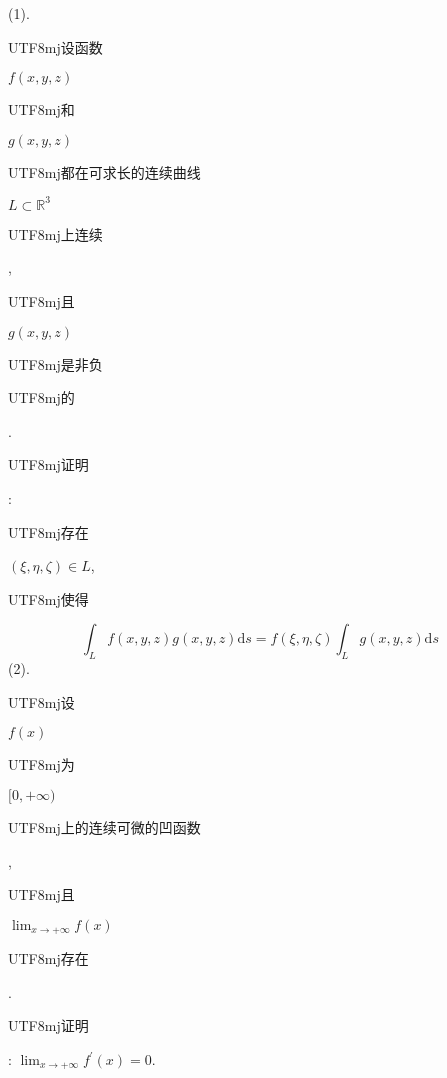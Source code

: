 \documentclass[10pt]{article}
\begin{document}
(1). \begin{CJK}{UTF8}{mj}设函数\end{CJK} $f(x, y, z)$ \begin{CJK}{UTF8}{mj}和\end{CJK} $g(x, y, z)$ \begin{CJK}{UTF8}{mj}都在可求长的连续曲线\end{CJK} $L \subset \mathbb{R}^{3}$ \begin{CJK}{UTF8}{mj}上连续\end{CJK}, \begin{CJK}{UTF8}{mj}且\end{CJK} $g(x, y, z)$ \begin{CJK}{UTF8}{mj}是非负\end{CJK} \begin{CJK}{UTF8}{mj}的\end{CJK}. \begin{CJK}{UTF8}{mj}证明\end{CJK}: \begin{CJK}{UTF8}{mj}存在\end{CJK} $(\xi, \eta, \zeta) \in L$, \begin{CJK}{UTF8}{mj}使得\end{CJK}
$$
\int_{L} f(x, y, z) g(x, y, z) \mathrm{d} s=f(\xi, \eta, \zeta) \int_{L} g(x, y, z) \mathrm{d} s
$$
(2). \begin{CJK}{UTF8}{mj}设\end{CJK} $f(x)$ \begin{CJK}{UTF8}{mj}为\end{CJK} $[0,+\infty)$ \begin{CJK}{UTF8}{mj}上的连续可微的凹函数\end{CJK}, \begin{CJK}{UTF8}{mj}且\end{CJK} $\lim _{x \rightarrow+\infty} f(x)$ \begin{CJK}{UTF8}{mj}存在\end{CJK}. \begin{CJK}{UTF8}{mj}证明\end{CJK}: $\lim _{x \rightarrow+\infty} f^{\prime}(x)=0$.
\end{document}
